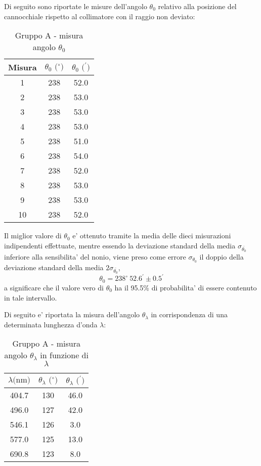 Di seguito sono riportate le misure dell'angolo $\theta_0$ relativo alla posizione del cannocchiale rispetto al collimatore con il raggio non deviato:
\begin{table}[!htbp]
    {\par\centering
    \begin{tabular}{ccc}
        \hline
        Misura & $\theta_0 \text{ ($^{\circ}$)}$ & $\theta_0 \text{ ($^{\prime}$)}$ \\
        \hline
        1   &   238 &   52.0\\
        2   &   238 &   53.0\\
        3   &   238 &   53.0\\
        4   &   238 &   53.0\\
        5   &   238 &   51.0\\
        6   &   238 &   54.0\\
        7   &   238 &   52.0\\
        8   &   238 &   53.0\\
        9   &   238 &   53.0\\
        10  &   238 &   52.0\\
        \hline
    \end{tabular}
    \par}
    \caption{Gruppo A - misura angolo $\theta_0$}
\end{table}

Il miglior valore di $\theta_0$ e' ottenuto tramite la media delle dieci misurazioni indipendenti effettuate, mentre essendo la deviazione standard della media $\sigma_{\bar{\theta_0}}$ inferiore alla sensibilita' del nonio, viene preso come errore $\sigma_{\theta_0}$ il doppio della deviazione standard della media $2\sigma_{\bar{\theta_0}}$,
\[
    \theta_0 = 238^{\circ} \ 52.6^{\prime} \pm 0.5^{\prime}
\]
a significare che il valore vero di $\theta_0$ ha il 95.5\% di probabilita' di essere contenuto in tale intervallo.

Di seguito e' riportata la misura dell'angolo $\theta_{\lambda}$ in corrispondenza di una determinata lunghezza d'onda $\lambda$:
\begin{table}[!htbp]
    {\par\centering
    \begin{tabular}{ccc}
        \hline
        $\lambda \text{(nm)}$ &
        $\theta_{\lambda} \text{ ($^{\circ}$)}$ & 
        $\theta_{\lambda} \text{ ($^{\prime}$)}$ \\
        \hline
        404.7   &   130 &   46.0\\
        496.0   &   127 &   42.0\\
        546.1   &   126 &   3.0\\
        577.0   &   125 &   13.0\\
        690.8   &   123 &   8.0\\
        \hline
    \end{tabular}
    \par}
    \caption{Gruppo A - misura angolo $\theta_{\lambda}$ in funzione di $\lambda$}
\end{table}

